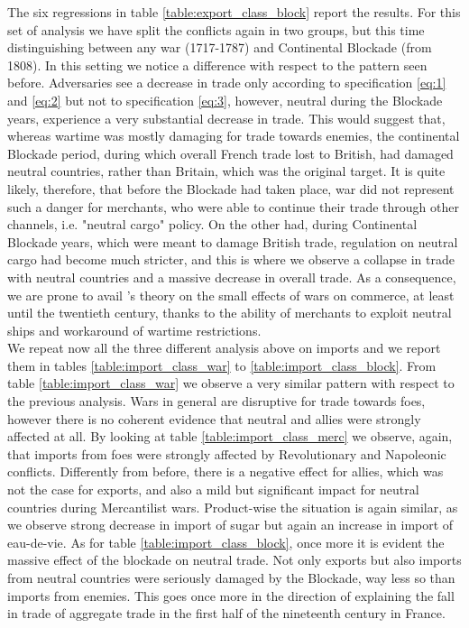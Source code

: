 \documentclass[12pt,a4paper,notitlepage,english]{article}
\begin{document}
The six regressions in table \ref{table:export_class_block} report the results.
For this set of analysis we have split the conflicts again in two groups, but this time distinguishing between any war (1717-1787) and Continental Blockade (from 1808).
In this setting we notice a difference with respect to the pattern seen before.
Adversaries see a decrease in trade only according to specification \ref{eq:1} and \ref{eq:2} but not to specification \ref{eq:3}, however, neutral during the Blockade years, experience a very substantial decrease in trade.
This would suggest that, whereas wartime was mostly damaging for trade towards enemies, the continental Blockade period, during which overall French trade lost to British, had damaged neutral countries, rather than Britain, which was the original target.
It is quite likely, therefore, that before the Blockade had taken place, war did not represent such a danger for merchants, who were able to continue their trade through other channels, i.e. "neutral cargo" policy.
On the other had, during Continental Blockade years, which were meant to damage British trade, regulation on neutral cargo had become much stricter, and this is where we observe a collapse in trade with neutral countries and a massive decrease in overall trade.
As a consequence, we are prone to avail \cite{riley_seven_1986}'s theory on the small effects of wars on commerce, at least until the twentieth century, thanks to the ability of merchants to exploit neutral ships and workaround of wartime restrictions.\\
We repeat now all the three different analysis above on imports and we report them in tables \ref{table:import_class_war} to \ref{table:import_class_block}.
From table \ref{table:import_class_war} we observe a very similar pattern with respect to the previous analysis.
Wars in general are disruptive for trade towards foes, however there is no coherent evidence that neutral and allies were strongly affected at all.
By looking at table \ref{table:import_class_merc} we observe, again, that imports from foes were strongly affected by Revolutionary and Napoleonic conflicts.
Differently from before, there is a negative effect for allies, which was not the case for exports, and also a mild but significant impact for neutral countries during Mercantilist wars.
Product-wise the situation is again similar, as we observe strong decrease in import of sugar but again an increase in import of eau-de-vie.
As for table \ref{table:import_class_block}, once more it is evident the massive effect of the blockade on neutral trade.
Not only exports but also imports from neutral countries were seriously damaged by the Blockade, way less so than imports from enemies.
This goes once more in the direction of explaining the fall in trade of aggregate trade in the first half of the nineteenth century in France. \\
\end{document}
